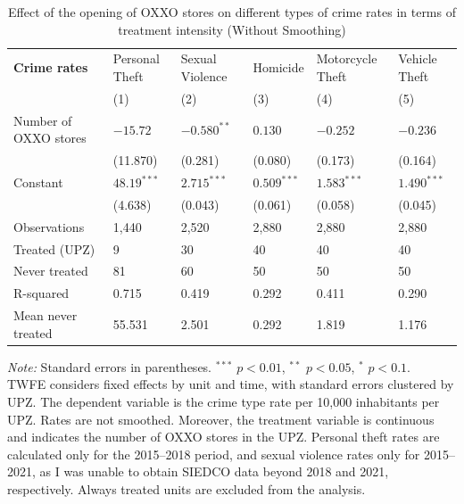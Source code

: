 \documentclass[12pt]{article}
\begin{document}
\begin{table}[H]
\centering
\caption{Effect of the opening of OXXO stores on different types of crime rates in terms of treatment intensity (Without Smoothing)}
\label{tab:resultados_regresion_no_smooth_intensity}
\small


\begin{tabularx}{\textwidth}{l C C C C C}
\hline\hline
\textbf{Crime rates} & Personal Theft & Sexual Violence & Homicide & Motorcycle Theft & Vehicle Theft \\
 & (1) & (2) & (3) & (4) & (5) \\
\hline 
Number of OXXO stores & $-15.72$      & $-0.580^{**}$  & $0.130$       & $-0.252$     & $-0.236$ \\
                      & (11.870)      & (0.281)       & (0.080)       & (0.173)       & (0.164) \\
Constant              & $48.19^{***}$ & $2.715^{***}$ & $0.509^{***}$ & $1.583^{***}$ & $1.490^{***}$ \\
                      & (4.638)       & (0.043)       & (0.061)       & (0.058)       & (0.045) \\
\hline
Observations          & 1,440         & 2,520         & 2,880         & 2,880         & 2,880 \\
Treated (UPZ)         & 9             & 30            & 40            & 40            & 40 \\
Never treated         & 81            & 60            & 50            & 50            & 50 \\
R-squared             & 0.715         & 0.419         & 0.292         & 0.411         & 0.290\\
Mean never treated    & 55.531        & 2.501         & 0.292         & 1.819         & 1.176 \\
\hline\hline
\end{tabularx}

\vspace{0.5em}
\parbox{\textwidth}{\footnotesize
    \textit{Note:} Standard errors in parentheses. $^{***}$ $p<0.01$, $^{**}$ $p<0.05$, $^{*}$ $p<0.1$. \\
    TWFE considers fixed effects by unit and time, with standard errors clustered by UPZ. 
    The dependent variable is the crime type rate per 10,000 inhabitants per UPZ. Rates are not smoothed. 
    Moreover, the treatment variable is continuous and indicates the number of OXXO stores in the UPZ.
    Personal theft rates are calculated only for the 2015–2018 period, and sexual violence rates only for 2015–2021, as I was unable to obtain SIEDCO data beyond 2018 and 2021, respectively.
    Always treated units are excluded from the analysis.
}
\end{table}
\end{document}
